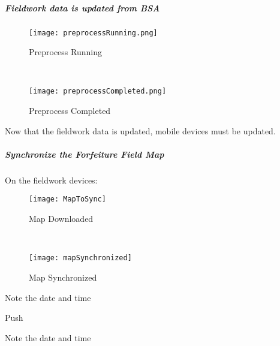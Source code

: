 \clearpage


\subparagraph*{Fieldwork data is updated from BSA}




  \begin{figure}[h!]

\centering
     \texttt{[image: preprocessRunning.png]}
\caption{Preprocess Running}
  \vspace{.5in}
 
  \HRule \\[.4cm] %
  \vspace{.5in}
    
     \texttt{[image: preprocessCompleted.png]}
\caption{Preprocess Completed}
 \end{figure}


\noindent Now that the fieldwork data is updated, mobile devices must be updated. 



\clearpage


 \subparagraph{Synchronize the Forfeiture Field Map}
  \vspace{.2in}
  
\noindent On the fieldwork devices:

 \begin{wrapfigure}{r}{0.6\textwidth}
 \centering
     \texttt{[image: MapToSync]}
 \vspace{-.2in}
 
 \caption{Map Downloaded}
 \vspace{.1in}

 \HRule \\[.4cm] %
 
 \vspace{.1in}

     \texttt{[image: mapSynchronized]}
 \vspace{.2in}

 \caption{Map Synchronized}
 \end{wrapfigure}
 \vspace{.5in}
 

{\smallbtn Note the date and time}
 \vspace{.5in}

{\bigbtn Push   \lookArrow}

 \vspace{4in}

 {\smallbtn Note the date and time}
 \vspace{1in}

